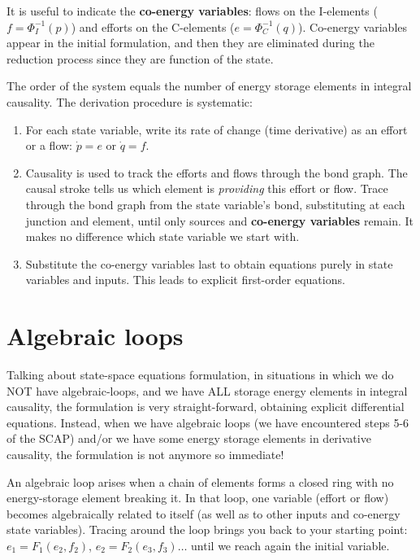 It is useful to indicate the \textbf{co-energy variables}: flows on the I-elements ($f = \Phi_I^{-1}(p)$) and efforts on the C-elements ($e = \Phi_C^{-1}(q)$). Co-energy variables appear in the initial formulation, and then they are eliminated during the reduction process since they are function of the state.

The order of the system equals the number of energy storage elements in integral causality. The derivation procedure is systematic:

\begin{enumerate}[leftmargin=2em,label=\textbf{(\arabic*)},itemsep=3pt]
  \item For each state variable, write its rate of change (time derivative) as an effort or a flow: $\dot{p} = e$ or $\dot{q} = f$.
  \item Causality is used to track the efforts and flows through the bond graph. The causal stroke tells us which element is \emph{providing} this effort or flow. Trace through the bond graph from the state variable's bond, substituting at each junction and element, until only sources and \textbf{co-energy variables} remain. It makes no difference which state variable we start with.
  \item Substitute the co-energy variables last to obtain equations purely in state variables and inputs. This leads to explicit first-order equations.
\end{enumerate}


\section{Algebraic loops}

Talking about state-space equations formulation, in situations in which we do NOT have algebraic-loops, and we have ALL storage energy elements in integral causality, the formulation is very straight-forward, obtaining explicit differential equations. Instead, when we have algebraic loops (we have encountered steps 5-6 of the SCAP) and/or we have some energy storage elements in derivative causality, the formulation is not anymore so immediate! 

An algebraic loop arises when a chain of elements forms a closed ring with no energy-storage element breaking it. In that loop, one variable (effort or flow) becomes algebraically related to itself (as well as to other inputs and co-energy state variables). Tracing around the loop brings you back to your starting point: $e_1 = F_1(e_2, f_2)$, $e_2 = F_2(e_3, f_3) \dots$ until we reach again the initial variable.

